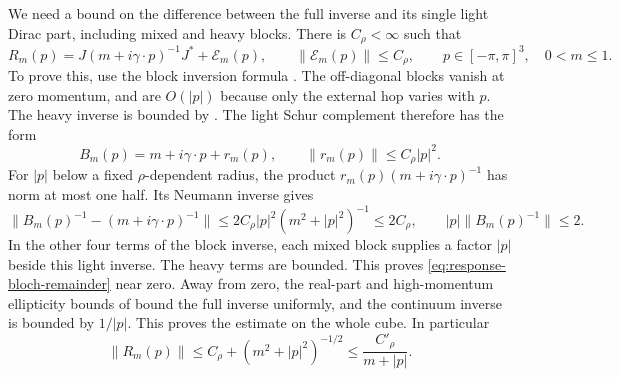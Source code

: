 \documentclass[11pt,letterpaper,reqno]{amsart}
\begin{document}
We need a bound on the difference between the full inverse
and its single light Dirac part, including mixed and heavy
blocks. There is $C_\rho<\infty$ such that
\begin{equation}\label{eq:response-bloch-remainder}
 R_m(p)=J(m+i\gamma\cdot p)^{-1}J^*+\mathcal E_m(p),\qquad
 \|\mathcal E_m(p)\|\le C_\rho,\qquad p\in[-\pi,\pi]^3,\quad0<m\le1.
\end{equation}
To prove this, use the block inversion formula
\cite[(16)]{FermionBlock}. The off-diagonal blocks
vanish at zero momentum, and are $O(|p|)$ because only
the external hop varies with $p$. The heavy inverse is
bounded by \cite[(10)]{FermionBlock}. The light Schur complement
therefore has the form
\[
 B_m(p)=m+i\gamma\cdot p+r_m(p),\qquad
                    \|r_m(p)\|\le C_\rho|p|^2.
\]
For $|p|$ below a fixed $\rho$-dependent radius, the product
$r_m(p)(m+i\gamma\cdot p)^{-1}$ has norm at most one half.
Its Neumann inverse gives
\[
 \|B_m(p)^{-1}-(m+i\gamma\cdot p)^{-1}\|
        \le2C_\rho |p|^2(m^2+|p|^2)^{-1}\le2C_\rho,
 \qquad |p|\|B_m(p)^{-1}\|\le2.
\]
In the other four terms of the block inverse, each mixed
block supplies a factor $|p|$ beside this light inverse.
The heavy terms are bounded. This proves
\eqref{eq:response-bloch-remainder} near zero. Away from
zero, the real-part and high-momentum ellipticity bounds
of \cite[\S2.2]{FermionBlock} bound the full inverse uniformly,
and the continuum inverse is bounded by $1/|p|$. This
proves the estimate on the whole cube. In particular
\begin{equation}\label{eq:response-bloch-bounds}
 \|R_m(p)\|\le C_\rho+(m^2+|p|^2)^{-1/2}
                    \le\frac{C'_\rho}{m+|p|}.
\end{equation}
\end{document}
